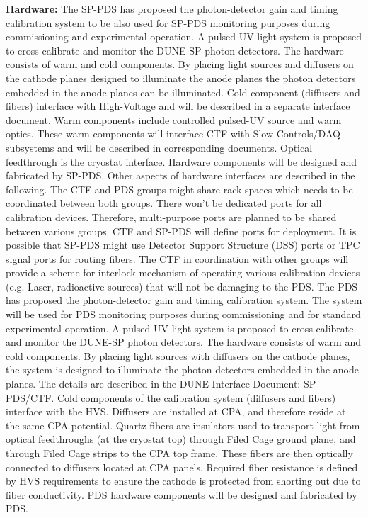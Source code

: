 \textbf{Hardware:} The SP-PDS has proposed the photon-detector gain and timing calibration system to be also used for SP-PDS monitoring purposes during commissioning and experimental operation. A pulsed UV-light system is proposed to cross-calibrate and monitor the DUNE-SP photon detectors. The hardware consists of warm and cold components. By placing light sources and diffusers on the cathode planes designed to illuminate the anode planes the photon detectors embedded in the anode planes can be illuminated. Cold component (diffusers and fibers) interface with High-Voltage and will be described in a separate interface document. Warm components include controlled pulsed-UV source and warm optics. These warm components will interface CTF with Slow-Controls/DAQ subsystems and will be described in corresponding documents. Optical feedthrough is the cryostat interface. Hardware components will be designed and fabricated by SP-PDS. Other aspects of hardware interfaces are described in the following. The CTF and PDS groups might share rack spaces which needs to be coordinated between both groups. There won’t be dedicated ports for all calibration devices. Therefore, multi-purpose ports are planned to be shared between various groups. CTF and SP-PDS will define ports for deployment. It is possible that SP-PDS might use Detector Support Structure (DSS) ports or TPC signal ports for routing fibers. The CTF in coordination with other groups will provide a scheme for interlock mechanism of operating various calibration devices (e.g. Laser, radioactive sources) that will not be damaging to the PDS. The PDS has proposed the photon-detector gain and timing calibration system. The system will be used for PDS monitoring purposes during commissioning and for standard experimental operation. A pulsed UV-light system is proposed to cross-calibrate and monitor the DUNE-SP photon detectors. The hardware consists of warm and cold components. By placing light sources with diffusers on the cathode planes, the system is designed to illuminate the photon detectors embedded in the anode planes. The details are described in the DUNE Interface Document: SP-PDS/CTF. Cold components of the calibration system (diffusers and fibers) interface with the HVS. Diffusers are installed at CPA, and therefore reside at the same CPA potential. Quartz fibers are insulators used to transport light from optical feedthroughs (at the cryostat top) through Filed Cage ground plane, and through Filed Cage strips to the CPA top frame. These fibers are then optically connected to diffusers located at CPA panels. Required fiber resistance is defined by HVS requirements to ensure the cathode is protected from shorting out due to fiber conductivity. PDS hardware components will be designed and fabricated by PDS.







